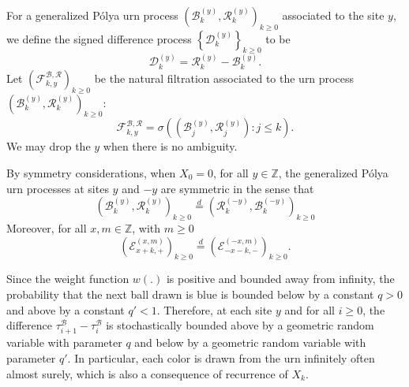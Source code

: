 \documentclass[EJP]{ejpecp} %
\begin{document}
For a generalized P\'{o}lya urn process $\left(\mathscr{B}^{(y)}_k,\mathscr{R}^{(y)}_k \right)_{k\geq 0}$ associated to the site $y$, we define the signed difference process $\left\{\mathscr{D}^{(y)}_{k}\right\}_{k \ge 0} $ to be
\begin{equation}\label{eq:signed difference}
	\mathscr{D}^{(y)}_k  =\mathscr{R}^{(y)}_k -\mathscr{B}^{(y)}_k.  
\end{equation}
Let $\left(\mathcal{F}^{\mathscr{B},\mathscr{R}}_{k, y}\right)_{k \ge 0}$ be the natural filtration associated to the urn process $\left(\mathscr{B}^{(y)}_k,\mathscr{R}^{(y)}_k \right)_{k\geq 0}$:  
\[
\mathcal{F}^{\mathscr{B},\mathscr{R}}_{k, y} = \sigma\left( \left(\mathscr{B}_j^{(y)},\mathscr{R}_j^{(y)} \right): j\leq k \right).
\]  
We may drop the $y$ when there is no ambiguity.
\begin{remark}
	\label{rm:symmetry}
	By symmetry considerations, when $X_0 = 0$, for all $y \in \mathbb{Z}$, the generalized P\'{o}lya urn processes at sites $y$ and $-y$ are symmetric in the sense that
	\[\left(\mathscr{B}^{(y)}_{k},\mathscr{R}^{(y)}_{k} \right)_{k\ge 0}
	\overset{d}{=} 
	\left(\mathscr{R}^{(-y)}_{k},\mathscr{B}^{(-y)}_{k} \right)_{k\ge 0} \]
	Moreover, for all $x, m \in \mathbb{Z}$, with $m\geq 0$
	\[
	\left(\mathcal{E}^{(x,m)}_{x+k,+} \right)_{k\geq 0} \overset{d}{=} \left(\mathcal{E}^{(-x,m)}_{-x-k,-} \right)_{k\geq 0}.
	\]
\end{remark}
\begin{remark}
	\label{rk:UrnGeo}
	Since the weight function $w(.)$ is positive and bounded away from infinity, the probability that the next ball drawn is blue is bounded below by a constant $q > 0$ and above by a constant $q' < 1$. Therefore, at each site $y$ and for all $i \ge 0$, the difference $\tau_{i+1}^{\mathscr{B}} - \tau_{i}^{\mathscr{B}}$ is stochastically bounded above by a geometric random variable with parameter $q$ and below by a geometric random variable with parameter $q'$.
	In particular, each color is drawn from the urn infinitely often almost surely, which is also a consequence of recurrence of $X_k$.
\end{remark}
\end{document}
